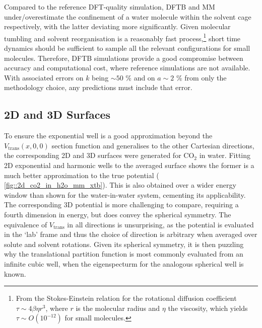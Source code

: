 \documentclass[../main.tex]{subfiles}
\begin{document}
Compared to the reference DFT-quality simulation, DFTB and MM under/overestimate the confinement of a water molecule within the solvent cage respectively, with the latter deviating more significantly. Given molecular tumbling and solvent reorganisation is a reasonably fast process,\footnote{From the Stokes-Einstein relation for the rotational diffusion coefficient $\tau \sim 4\beta\eta r^3$, where $r$ is the molecular radius and $\eta$ the viscosity, which yields $\tau \sim O(10^{-12})$ for small molecules.} short time dynamics should be sufficient to sample all the relevant configurations for small molecules. Therefore, DFTB simulations provide a good compromise between accuracy and computational cost, where reference simulations are not available. With associated errors on $k$ being $\sim 50$ \% and on $a \sim 2$ \% from only the methodology choice, any predictions must include that error.


\subsection{2D and 3D Surfaces}

To ensure the exponential well is a good approximation beyond the $V_\text{trans}(x, 0, 0)$ section function and generalises to the other Cartesian directions, the corresponding 2D and 3D surfaces were generated for CO$_2$ in water. Fitting 2D exponential and harmonic wells to the averaged surface shows the former is a much better approximation to the true potential (\figurename{ \ref{fig::2d_co2_in_h2o_mm_xtb}}). This is also obtained over a wider energy window than shown for the water-in-water system, cementing its applicability. The corresponding 3D potential is more challenging to compare, requiring a fourth dimension in energy, but does convey the spherical symmetry. The equivalence of $V_\text{trans}$ in all directions is unsurprising, as the potential is evaluated in the `lab' frame and thus the choice of direction is arbitrary when averaged over solute and solvent rotations. Given its spherical symmetry, it is then puzzling why the translational partition function is most commonly evaluated from an infinite cubic well, when the eigenspecturm for the analogous spherical well is known.\cite{Huang2016}
\end{document}
